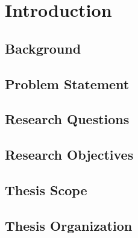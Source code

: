 \chapter{Introduction}
\label{ch:introduction}

\section{Background}
\label{sec:background}


\section{Problem Statement}
\label{sec:problem_statement}



\section{Research Questions}
\label{sec:research_questions}



\section{Research Objectives}
\label{sec:research_objectives}



\section{Thesis Scope}
\label{sec:thesis_scope}



\section{Thesis Organization}
\label{sec:thesis_organization}

